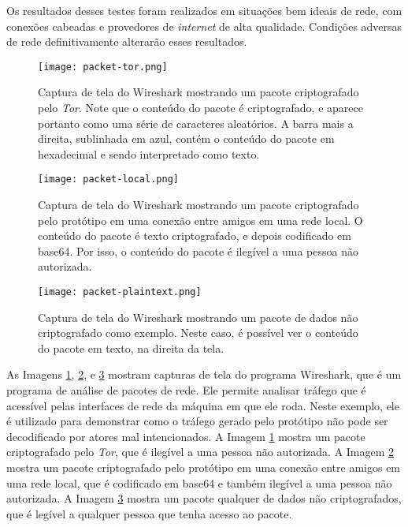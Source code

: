 Os resultados desses testes foram realizados em situações bem ideais de rede, com conexões cabeadas e provedores de \textit{internet} de alta qualidade. Condições adversas de rede definitivamente alterarão esses resultados.

\begin{figure}[H]
\centering
\texttt{[image: packet-tor.png]}
\caption{Captura de tela do Wireshark mostrando um pacote criptografado pelo \textit{Tor}. Note que o conteúdo do pacote é criptografado, e aparece portanto como uma série de caracteres aleatórios. A barra mais a direita, sublinhada em azul, contém o conteúdo do pacote em hexadecimal e sendo interpretado como texto.}
\label{fig:packet-tor}
\end{figure}

\begin{figure}[H]
\centering
\texttt{[image: packet-local.png]}
\caption{Captura de tela do Wireshark mostrando um pacote criptografado pelo protótipo em uma conexão entre amigos em uma rede local. O conteúdo do pacote é texto criptografado, e depois codificado em base64. Por isso, o conteúdo do pacote é ilegível a uma pessoa não autorizada.}
\label{fig:packet-local}
\end{figure}

\begin{figure}[H]
\centering
\texttt{[image: packet-plaintext.png]}
\caption{Captura de tela do Wireshark mostrando um pacote de dados não criptografado como exemplo. Neste caso, é possível ver o conteúdo do pacote em texto, na direita da tela.}
\label{fig:packet-plaintext}
\end{figure}

As Imagens \ref{fig:packet-tor}, \ref{fig:packet-local}, e \ref{fig:packet-plaintext} mostram capturas de tela do programa Wireshark, que é um programa de análise de pacotes de rede. Ele permite analisar tráfego que é acessível pelas interfaces de rede da máquina em que ele roda. Neste exemplo, ele é utilizado para demonstrar como o tráfego gerado pelo protótipo não pode ser decodificado por atores mal intencionados. A Imagem \ref{fig:packet-tor} mostra um pacote criptografado pelo \textit{Tor}, que é ilegível a uma pessoa não autorizada. A Imagem \ref{fig:packet-local} mostra um pacote criptografado pelo protótipo em uma conexão entre amigos em uma rede local, que é codificado em base64 e também ilegível a uma pessoa não autorizada. A Imagem \ref{fig:packet-plaintext} mostra um pacote qualquer de dados não criptografados, que é legível a qualquer pessoa que tenha acesso ao pacote.